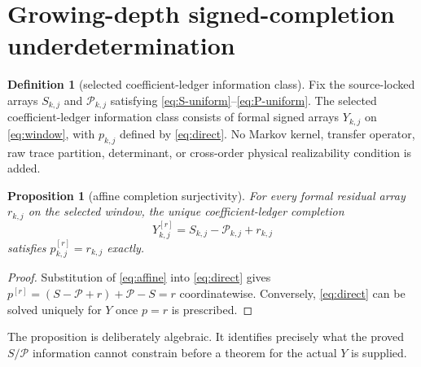 \documentclass[11pt]{article}
\newtheorem{proposition}[theorem]{Proposition}
\theoremstyle{definition}
\newtheorem{definition}[theorem]{Definition}
\theoremstyle{remark}
\newcommand{\cP}{\mathcal P}
\begin{document}
\section{Growing-depth signed-completion underdetermination}

\begin{definition}[selected coefficient-ledger information class]
Fix the source-locked arrays $S_{k,j}$ and $\cP_{k,j}$ satisfying
\eqref{eq:S-uniform}--\eqref{eq:P-uniform}.  The selected coefficient-ledger
information class consists of formal signed arrays $Y_{k,j}$ on
\eqref{eq:window}, with $p_{k,j}$ defined by \eqref{eq:direct}.  No Markov
kernel, transfer operator, raw trace partition, determinant, or cross-order
physical realizability condition is added.
\end{definition}

\begin{proposition}[affine completion surjectivity]
For every formal residual array $r_{k,j}$ on the selected window, the unique
coefficient-ledger completion
\begin{equation}\label{eq:affine}
 Y^{[r]}_{k,j}=S_{k,j}-\cP_{k,j}+r_{k,j}
\end{equation}
satisfies $p^{[r]}_{k,j}=r_{k,j}$ exactly.
\end{proposition}
\begin{proof}
Substitution of \eqref{eq:affine} into \eqref{eq:direct} gives
$p^{[r]}=(S-\cP+r)+\cP-S=r$ coordinatewise.  Conversely,
\eqref{eq:direct} can be solved uniquely for $Y$ once $p=r$ is prescribed.
\end{proof}

The proposition is deliberately algebraic.  It identifies precisely what
the proved $S/\cP$ information cannot constrain before a theorem for the
actual $Y$ is supplied.
\end{document}
